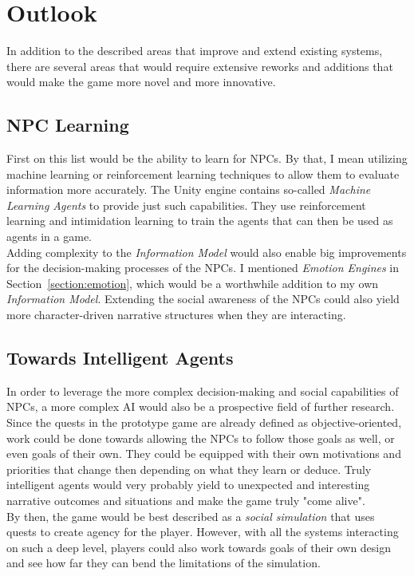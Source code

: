 \section{Outlook}
In addition to the described areas that improve and extend existing systems, there are several areas that would require extensive reworks and additions that would make the game more novel and more innovative.
\subsection{NPC Learning}
First on this list would be the ability to learn for NPCs. By that, I mean utilizing machine learning or reinforcement learning techniques to allow them to evaluate information more accurately. The Unity engine contains so-called \textit{Machine Learning Agents} to provide just such capabilities. They use reinforcement learning and intimidation learning to train the agents that can then be used as agents in a game.\\
Adding complexity to the \textit{Information Model} would also enable big improvements for the decision-making processes of the NPCs. I mentioned \textit{Emotion Engines} in Section~\ref{section:emotion}, which would be a worthwhile addition to my own \textit{Information Model}. Extending the social awareness of the NPCs could also yield more character-driven narrative structures when they are interacting.
\subsection{Towards Intelligent Agents}
In order to leverage the more complex decision-making and social capabilities of NPCs, a more complex AI would also be a prospective field of further research. Since the quests in the prototype game are already defined as objective-oriented, work could be done towards allowing the NPCs to follow those goals as well, or even goals of their own. They could be equipped with their own motivations and priorities that change then depending on what they learn or deduce. Truly intelligent agents would very probably yield to unexpected and interesting narrative outcomes and situations and make the game truly "come alive".\\
By then, the game would be best described as a \textit{social simulation} that uses quests to create agency for the player. However, with all the systems interacting on such a deep level, players could also work towards goals of their own design and see how far they can bend the limitations of the simulation.
